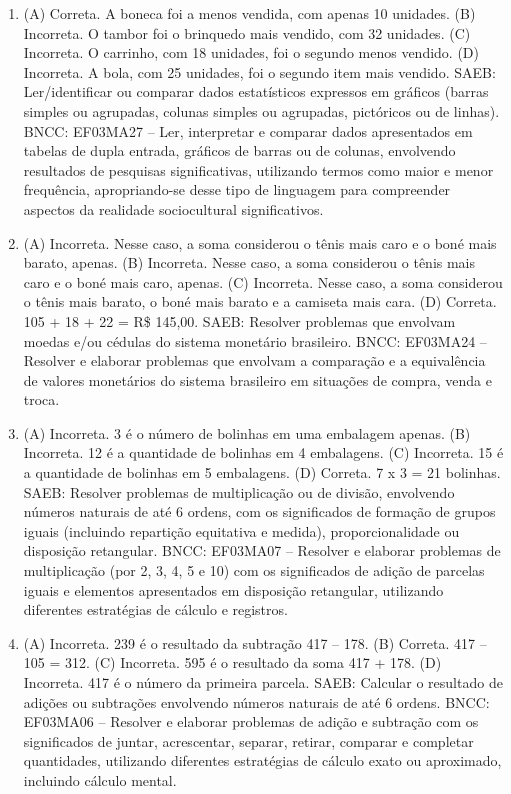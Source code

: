 \begin{enumerate}
\item
(A) Correta. A boneca foi a menos vendida, com apenas 10 unidades.
(B) Incorreta. O tambor foi o brinquedo mais vendido, com 32 unidades.
(C) Incorreta. O carrinho, com 18 unidades, foi o segundo menos vendido.
(D) Incorreta. A bola, com 25 unidades, foi o segundo item mais vendido.
SAEB: Ler/identificar ou comparar dados estatísticos
expressos em gráficos (barras simples ou agrupadas, colunas simples ou agrupadas, pictóricos ou de linhas).
BNCC: EF03MA27 -- Ler, interpretar e comparar dados apresentados em tabelas de dupla entrada,
gráficos de barras ou de colunas, envolvendo resultados de pesquisas significativas, utilizando
termos como maior e menor frequência, apropriando-se desse tipo de linguagem para
compreender aspectos da realidade sociocultural significativos.

\item
(A) Incorreta. Nesse caso, a soma considerou o tênis mais caro e o boné mais barato, apenas.
(B) Incorreta. Nesse caso, a soma considerou o tênis mais caro e o boné mais caro, apenas.
(C) Incorreta. Nesse caso, a soma considerou o tênis mais barato, o boné mais barato e a camiseta mais cara.
(D) Correta. 105 + 18 + 22 = R\$ 145,00.
SAEB: Resolver problemas que envolvam moedas e/ou cédulas do sistema monetário brasileiro.
BNCC: EF03MA24 -- Resolver e elaborar problemas que envolvam a comparação e a equivalência de
valores monetários do sistema brasileiro em situações de compra, venda e troca.

\item
(A) Incorreta. 3 é o número de bolinhas em uma embalagem apenas.
(B) Incorreta. 12 é a quantidade de bolinhas em 4 embalagens.
(C) Incorreta. 15 é a quantidade de bolinhas em 5 embalagens.
(D) Correta. 7 x 3 = 21 bolinhas.
SAEB: Resolver problemas de multiplicação ou de divisão, envolvendo números naturais de até 6 ordens, com os significados de formação de grupos iguais (incluindo repartição equitativa e medida), proporcionalidade ou disposição retangular.
BNCC: EF03MA07 – Resolver e elaborar problemas de multiplicação (por 2, 3, 4, 5 e 10) com os
significados de adição de parcelas iguais e elementos apresentados em disposição retangular,
utilizando diferentes estratégias de cálculo e registros.

\item
(A) Incorreta. 239 é o resultado da subtração 417 -- 178.
(B) Correta. 417 -- 105 = 312.
(C) Incorreta. 595 é o resultado da soma 417 + 178.
(D) Incorreta. 417 é o número da primeira parcela.
SAEB: Calcular o resultado de adições ou subtrações
envolvendo números naturais de até 6 ordens.
BNCC: EF03MA06 – Resolver e elaborar problemas de adição e subtração com os significados de
juntar, acrescentar, separar, retirar, comparar e completar quantidades, utilizando diferentes
estratégias de cálculo exato ou aproximado, incluindo cálculo mental.
\end{enumerate}